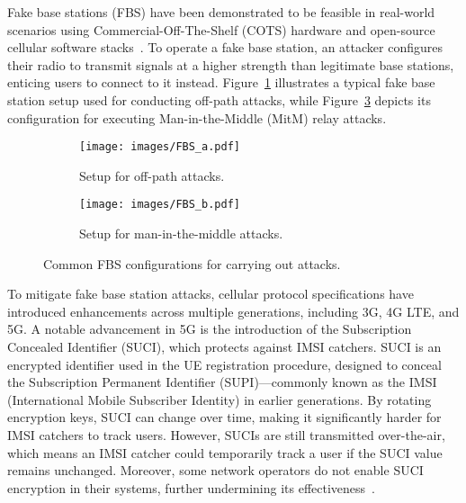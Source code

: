 Fake base stations (FBS) have been demonstrated to be feasible in real-world scenarios using Commercial-Off-The-Shelf (COTS) hardware and open-source cellular software stacks~\cite{strobel2007imsi, paget2010practical, kune2012location, shaik2015practical}. To operate a fake base station, an attacker configures their radio to transmit signals at a higher strength than legitimate base stations, enticing users to connect to it instead. Figure~\ref{FBS_a} illustrates a typical fake base station setup used for conducting off-path attacks, while Figure~\ref{FBS_b} depicts its configuration for executing Man-in-the-Middle (MitM) relay attacks.

\begin{figure}[t]
 \centering
    \begin{subfigure}{1\linewidth}
    \texttt{[image: images/FBS\_a.pdf]}
        \caption{Setup for off-path attacks.}
        \label{FBS_a}
    \end{subfigure}
    
    \begin{subfigure}{1\linewidth}
    \texttt{[image: images/FBS\_b.pdf]}
        \caption{Setup for man-in-the-middle attacks.}
        \label{FBS_b}
    \end{subfigure}
        \caption{Common FBS configurations for carrying out attacks.}
    \end{figure}

To mitigate fake base station attacks, cellular protocol specifications have introduced enhancements across multiple generations, including 3G, 4G LTE, and 5G. A notable advancement in 5G is the introduction of the Subscription Concealed Identifier (SUCI), which protects against IMSI catchers. SUCI is an encrypted identifier used in the UE registration procedure, designed to conceal the Subscription Permanent Identifier (SUPI)---commonly known as the IMSI (International Mobile Subscriber Identity) in earlier generations. By rotating encryption keys, SUCI can change over time, making it significantly harder for IMSI catchers to track users. However, SUCIs are still transmitted over-the-air, which means an IMSI catcher could temporarily track a user if the SUCI value remains unchanged. Moreover, some network operators do not enable SUCI encryption in their systems, further undermining its effectiveness~\cite{nie2022measuring}.

